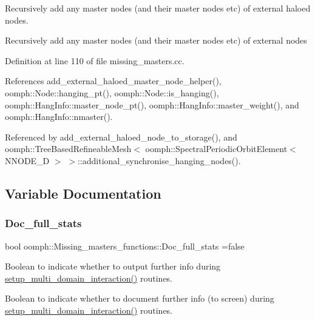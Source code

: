 Recursively add any master nodes (and their master nodes etc) of external haloed nodes. 

Recursively add any master nodes (and their master nodes etc) of external nodes 

Definition at line 110 of file missing\+\_\+masters.\+cc.



References add\+\_\+external\+\_\+haloed\+\_\+master\+\_\+node\+\_\+helper(), oomph\+::\+Node\+::hanging\+\_\+pt(), oomph\+::\+Node\+::is\+\_\+hanging(), oomph\+::\+Hang\+Info\+::master\+\_\+node\+\_\+pt(), oomph\+::\+Hang\+Info\+::master\+\_\+weight(), and oomph\+::\+Hang\+Info\+::nmaster().



Referenced by add\+\_\+external\+\_\+haloed\+\_\+node\+\_\+to\+\_\+storage(), and oomph\+::\+Tree\+Based\+Refineable\+Mesh$<$ oomph\+::\+Spectral\+Periodic\+Orbit\+Element$<$ N\+N\+O\+D\+E\+\_\+D $>$ $>$\+::additional\+\_\+synchronise\+\_\+hanging\+\_\+nodes().



\subsection{Variable Documentation}
\mbox{\label{namespaceoomph_1_1Missing__masters__functions_a5059632b6254fcfc11f688e3e643d71c}} 
\subsubsection{\texorpdfstring{Doc\+\_\+full\+\_\+stats}{Doc\_full\_stats}}
{\footnotesize\ttfamily bool oomph\+::\+Missing\+\_\+masters\+\_\+functions\+::\+Doc\+\_\+full\+\_\+stats =false}



Boolean to indicate whether to output further info during \hyperlink{namespaceoomph_1_1Multi__domain__functions_ac64183e03f173c69ed6ed6f493a1a67e}{setup\+\_\+multi\+\_\+domain\+\_\+interaction()} routines. 

Boolean to indicate whether to document further info (to screen) during \hyperlink{namespaceoomph_1_1Multi__domain__functions_ac64183e03f173c69ed6ed6f493a1a67e}{setup\+\_\+multi\+\_\+domain\+\_\+interaction()} routines. 

